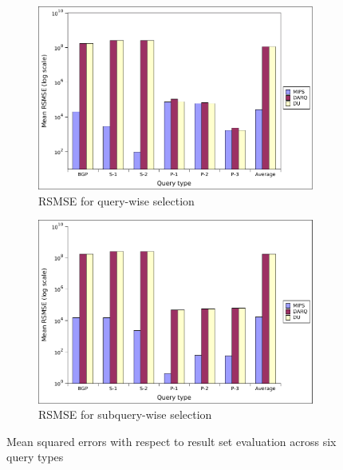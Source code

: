 \documentclass{sig-alternate}  %
\begin{document}
\begin{figure}
\centering
\begin{subfigure}[b]{0.45\textwidth}
                \centering
\includegraphics[width=\textwidth]{img/querywise_rse}
                \caption{RSMSE for query-wise selection}
                \label{fig:rsmseQuery}
        \end{subfigure}
\begin{subfigure}[b]{0.45\textwidth}
                \centering
\includegraphics[width=\textwidth]{img/subquerywise_rse}
                \caption{RSMSE for subquery-wise selection}
                \label{fig:rsmseSubquery}
        \end{subfigure}
\caption{Mean squared errors with respect to result set evaluation across six query types}
\label{fig:rsmse}
\end{figure}
\end{document}

